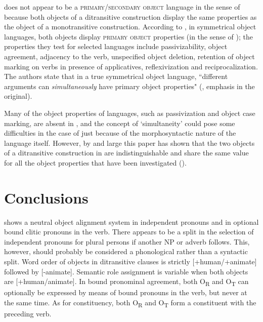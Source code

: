 \documentclass[output=paper]{langsci/langscibook}
\begin{document}
 does not appear to be a \textsc{primary}/\textsc{secondary object} language in the sense of \citet{dryer1986} because both objects of a ditransitive construction display the same properties as the object of a monotransitive construction. According to \citet[147]{bresnanmoshi1990}, in symmetrical object languages, both objects display \textsc{primary object} properties (in the sense of \citealt{dryer1986}); the properties they test for selected  languages include passivizability, object agreement, adjacency to the verb, unspecified object deletion, retention of object marking on verbs in presence of applicatives, reflexivization and reciprocalization. The authors state that in a true symmetrical object language, ``different arguments can \textit{simultaneously} have primary object properties" (\citealt[153]{bresnanmoshi1990}, emphasis in the original).

Many of the object properties of  languages, such as passivization and object case marking, are absent in , and the concept of `simultaneity' could pose some difficulties in the case of  just because of the morphosyntactic nature of the language itself. However, by and large this paper has shown that the two objects of a ditransitive construction in  are indistinguishable and share the same value for all the object properties that have been investigated ().  

\section{Conclusions}\label{§7:conclusions.pacchiarotti}

 shows a neutral object alignment system in independent pronouns and in optional bound clitic pronouns in the verb. There appears to be a split in the selection of independent pronouns for plural persons if another NP or adverb follows. This, however, should probably be considered a phonological rather than a syntactic split. Word order of objects in ditransitive clauses is strictly [+human/+animate] followed by [-animate]. Semantic role assignment is variable when both objects are [+human/animate]. In bound pronominal agreement, both O\textsubscript{R} and O\textsubscript{T} can optionally be expressed by means of bound pronouns in the verb, but never at the same time. As for constituency, both O\textsubscript{R} and O\textsubscript{T} form a constituent with the preceding verb. 
\end{document}
